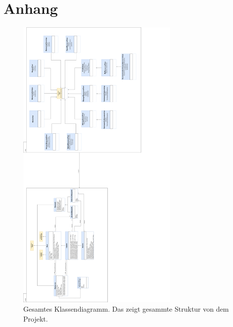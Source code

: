 \documentclass[parskip=full,11pt]{scrartcl}
\begin{document}
 \newpage
 \section{Anhang}
 \begin{figure}[ht!]
 	\centering
 	\includegraphics[width=0.7\textwidth]{res/models+views.png}
 	\caption{Gesamtes Klassendiagramm. Das zeigt gesammte Struktur von dem Projekt.}
 \end{figure}
 \newpage
{}
\printglossary	
	
 
\end{document}
